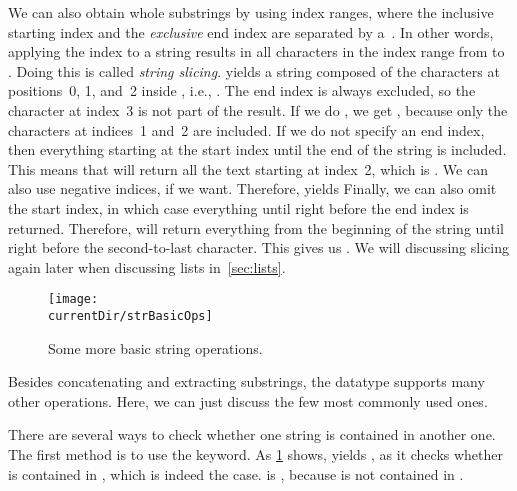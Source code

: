 We can also obtain whole substrings by using index ranges, where the inclusive starting index and the \emph{exclusive} end index are separated by a~\pythonilIdx{:}.
In other words, applying the index \pythonil{[a:b]} to a string results in all characters in the index range from  to .
Doing this is called \emph{string slicing}.
 yields a string composed of the characters at positions~0, 1, and~2 inside , i.e., .
The end index is always excluded, so the character at index~3 is not part of the result.
If we do , we get , because only the characters at indices~1 and~2 are included.
If we do not specify an end index, then everything starting at the start index until the end of the string is included.
This means that  will return all the text starting at index~2, which is .
We can also use negative indices, if we want.
Therefore,  yields 
Finally, we can also omit the start index, in which case everything until right before the end index is returned.
Therefore,  will return everything from the beginning of the string until right before the second-to-last character.
This gives us .
We will discussing slicing again later when discussing lists in~\cref{sec:lists}.

\begin{figure}%
\centering%
\texttt{[image: \\currentDir/strBasicOps]}%
\caption{Some more basic string operations.}%
\label{fig:strBasicOps}%
\end{figure}%

Besides concatenating and extracting substrings, the  datatype supports many other operations.
Here, we can just discuss the few most commonly used ones.

There are several ways to check whether one string is contained in another one.
The first method is to use the  keyword.
As \cref{fig:strBasicOps} shows,  yields , as it checks whether  is contained in , which is indeed the case.
 is , because  is not contained in .

